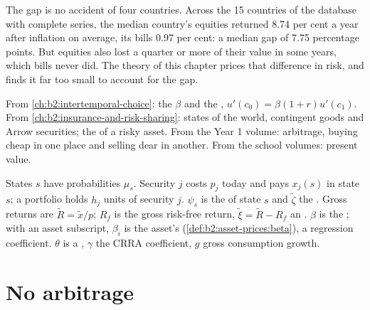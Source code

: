 The gap is no accident of four countries. Across the 15 countries of the database with complete
series, the median country's equities returned 8.74 per cent a year after inflation on average, its
bills 0.97 per cent: a median gap of 7.75 percentage points. But equities also lost a quarter or more of
their value in some years, which bills never did. The theory of this chapter prices that difference in
risk, and finds it far too small to account for the gap.

\begin{recall}
From \cref{ch:b2:intertemporal-choice}: the  $\beta$ and the , $u'(c_0) =
\beta(1 + r)u'(c_1)$. From \cref{ch:b2:insurance-and-risk-sharing}: states of the world, contingent
goods and Arrow securities; the  of a risky asset. From the Year 1 volume: arbitrage,
buying cheap in one place and selling dear in another. From the school volumes: present value.
\end{recall}

\begin{notation}\label{not:b2:asset-prices:symbols}
States $s$ have probabilities $\mu_s$. Security $j$ costs $p_j$ today and pays $x_j(s)$ in state $s$; a
portfolio holds $h_j$ units of security $j$. $\psi_s$ is the  of state $s$ and
$\tilde\zeta$ the . Gross returns are $\tilde R = \tilde x/p$; $R_f$ is the
gross risk-free return, $\tilde\xi = \tilde R - R_f$ an . $\beta$ is the ;
with an asset subscript, $\beta_i$ is the asset's  (\cref{def:b2:asset-prices:beta}), a regression
coefficient. $\theta$ is a , $\gamma$ the CRRA coefficient, $g$ gross consumption growth.
\end{notation}

\section{No arbitrage}\label{sec:b2:asset-prices:no-arbitrage}

